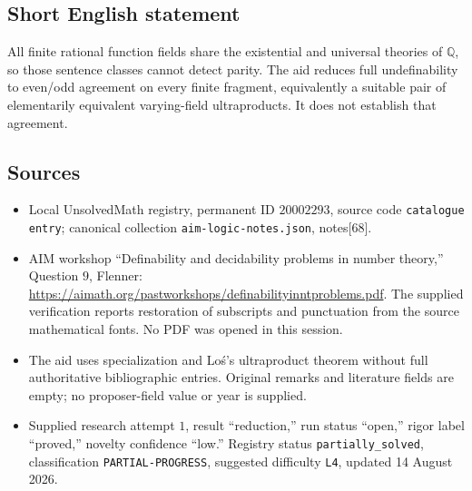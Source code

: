 \documentclass[11pt]{article}
\newcommand{\Q}{\mathbb{Q}}
\begin{document}
\subsection{Short English statement}
All finite rational function fields share the existential and universal theories of \(\Q\), so those sentence classes cannot detect parity. The aid reduces full undefinability to even/odd agreement on every finite fragment, equivalently a suitable pair of elementarily equivalent varying-field ultraproducts. It does not establish that agreement.
\subsection{Sources}
\begin{itemize}
\item Local UnsolvedMath registry, permanent ID \(20002293\), source code \texttt{catalogue entry}; canonical collection \texttt{aim-logic-notes.json}, notes[68].
\item AIM workshop ``Definability and decidability problems in number theory,'' Question \(9\), Flenner: \url{https://aimath.org/pastworkshops/definabilityinntproblems.pdf}. The supplied verification reports restoration of subscripts and punctuation from the source mathematical fonts. No PDF was opened in this session.
\item The aid uses specialization and Lo\'s's ultraproduct theorem without full authoritative bibliographic entries. Original remarks and literature fields are empty; no proposer-field value or year is supplied.
\item Supplied research attempt \(1\), result ``reduction,'' run status ``open,'' rigor label ``proved,'' novelty confidence ``low.'' Registry status \texttt{partially\_solved}, classification \texttt{PARTIAL-PROGRESS}, suggested difficulty \texttt{L4}, updated 14 August 2026.
\end{itemize}
\end{document}
